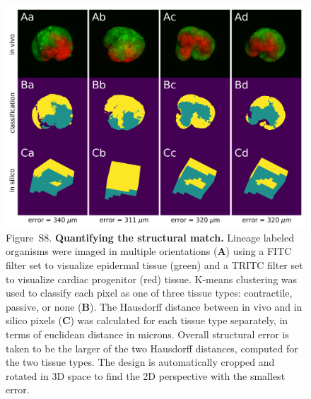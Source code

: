 \begin{figure}[t]
\centering
\includegraphics[width=\linewidth]{Chapter07/img/shape_match.png}
\caption*{Figure~S8.  \textbf{Quantifying the structural match.} 
Lineage labeled organisms were imaged in multiple orientations (\textbf{A}) using a FITC filter set to visualize epidermal tissue (green) and a TRITC filter set to visualize cardiac progenitor (red) tissue. 
K-means clustering was used to classify each pixel as one of three tissue types: contractile, passive, or none (\textbf{B}). 
The Hausdorff distance between in vivo and in silico pixels (\textbf{C}) was calculated for each tissue type separately, in terms of euclidean distance in microns. 
Overall structural error is taken to be the larger of the two Hausdorff distances, computed for the two tissue types. 
The design is automatically cropped and rotated in 3D space to find the 2D perspective with the smallest error.
}
\end{figure}


